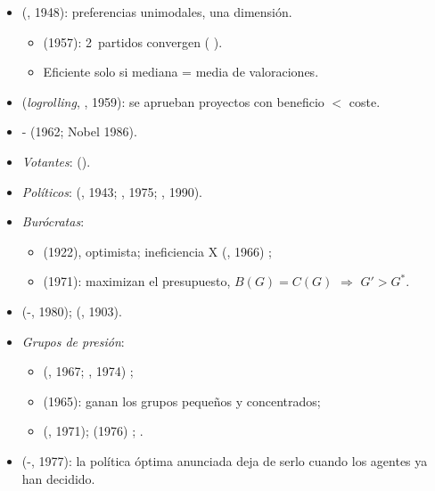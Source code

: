 \documentclass{article}
\begin{document}
\begin{columnas}
\begin{itemize}
\item {} (, 1948): preferencias unimodales, una dimensión.
  \begin{itemize}
  \item {} (1957): 2~partidos convergen ( ).
  \item Eficiente solo si mediana = media de valoraciones.
  \end{itemize}
\item {} (\emph{logrolling}, , 1959): se aprueban proyectos con beneficio $<$ coste.
\end{itemize}
\begin{itemize}
\item {}- (1962; Nobel 1986).
\item \emph{Votantes}:  ().
\item \emph{Políticos}:  (, 1943; , 1975; , 1990).
\item \emph{Burócratas}:
  \begin{itemize}
  \item {} (1922), optimista; ineficiencia X (, 1966) ;
  \item {} (1971): maximizan el presupuesto, $B(G)=C(G)$ $\Rightarrow$ $G'>G^*$.
  \end{itemize}
\item {} (-, 1980);  (, 1903).
\item \emph{Grupos de presión}:
  \begin{itemize}
  \item {} (, 1967; , 1974) ;
  \item {} (1965): ganan los grupos pequeños y concentrados;
  \item {} (, 1971);  (1976) ;  .
  \end{itemize}
\end{itemize}
\begin{itemize}
\item {} (-, 1977): la política óptima anunciada deja de serlo cuando los agentes ya han decidido.

\end{itemize}
\end{columnas}
\end{document}
